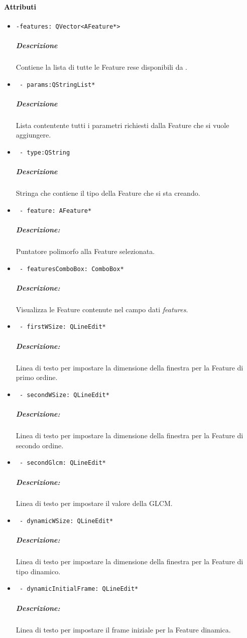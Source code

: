 \paragraph{\textcolor{black}{Attributi\\}}
\begin{itemize}
\item \color{teal}\verb!-features: QVector<AFeature*>!
\color{black}
\subparagraph{Descrizione}
Contiene la lista di tutte le Feature\g{} rese disponibili da \project.
\item \color{teal}\verb! - params:QStringList*!
\color{black} 
\subparagraph{Descrizione}
Lista contentente tutti i parametri richiesti dalla Feature\g{} che si vuole aggiungere.
\item \color{teal}\verb! - type:QString!
\color{black} 
\subparagraph{Descrizione}
Stringa che contiene il tipo della Feature\g{} che si sta creando.


\item \color{teal}\verb! - feature: AFeature*!
\color{black} 
\subparagraph{Descrizione: }Puntatore polimorfo alla Feature\g{} selezionata.
\item \color{teal}\verb! - featuresComboBox: ComboBox*!
\color{black} 
\subparagraph{Descrizione: }Visualizza le Feature\g{} contenute nel campo dati \emph{features}.
\item \color{teal}\verb! - firstWSize: QLineEdit*!
\color{black} 
\subparagraph{Descrizione:} Linea di testo per impostare la dimensione della finestra per la Feature\g{} di primo ordine.

\item \color{teal}\verb! - secondWSize: QLineEdit*!
\color{black} 
\subparagraph{Descrizione: }Linea di testo per impostare la dimensione della finestra per la Feature\g{} di secondo ordine.

\item \color{teal}\verb! - secondGlcm: QLineEdit*!
\color{black} 
\subparagraph{Descrizione:} Linea di testo per impostare il valore della GLCM\g{}.

\item \color{teal}\verb! - dynamicWSize: QLineEdit*!
\color{black} 
\subparagraph{Descrizione: }Linea di testo per impostare la dimensione della finestra per la Feature\g{} di tipo dinamico.

\item \color{teal}\verb! - dynamicInitialFrame: QLineEdit*!
\color{black} 
\subparagraph{Descrizione: }Linea di testo per impostare il frame iniziale per la Feature\g{} dinamica.


\end{itemize}
